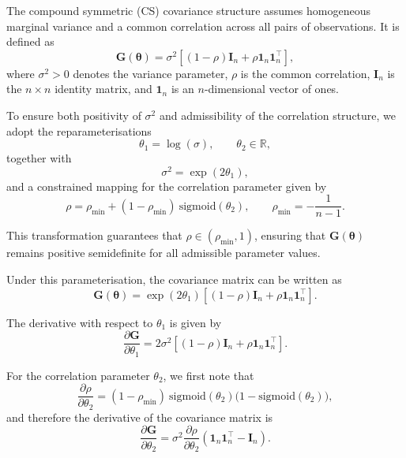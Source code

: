 \documentclass[
  letterpaper,
  DIV=11,
  numbers=noendperiod]{scrartcl}
\begin{document}
The compound symmetric (CS) covariance structure assumes homogeneous
marginal variance and a common correlation across all pairs of
observations. It is defined as \begin{equation}
\symbf{G}(\symbf{\theta}) = \sigma^2 \left[(1 - \rho)\symbf{I}_n + \rho \mathbf{1}_n \mathbf{1}_n^\top \right],
\end{equation} where \(\sigma^2 > 0\) denotes the variance parameter,
\(\rho\) is the common correlation, \(\symbf{I}_n\) is the
\(n \times n\) identity matrix, and \(\mathbf{1}_n\) is an
\(n\)-dimensional vector of ones.

To ensure both positivity of \(\sigma^2\) and admissibility of the
correlation structure, we adopt the reparameterisations \begin{equation}
\theta_1 = \log(\sigma), \qquad \theta_2 \in \mathbb{R},
\end{equation} together with \begin{equation}
\sigma^2 = \exp(2\theta_1),
\end{equation} and a constrained mapping for the correlation parameter
given by \begin{equation}
\rho = \rho_{\min} + (1 - \rho_{\min})~ \mathrm{sigmoid}(\theta_2),
\qquad \rho_{\min} = -\frac{1}{n - 1}.
\end{equation}

This transformation guarantees that \(\rho \in (\rho_{\min}, 1)\),
ensuring that \(\symbf{G}(\symbf{\theta})\) remains positive
semidefinite for all admissible parameter values.

Under this parameterisation, the covariance matrix can be written as
\begin{equation}
\symbf{G}(\symbf{\theta})
= \exp(2\theta_1)\left[(1 - \rho)\symbf{I}_n + \rho \mathbf{1}_n \mathbf{1}_n^\top \right].
\end{equation}

The derivative with respect to \(\theta_1\) is given by \begin{equation}
\frac{\partial \symbf{G}}{\partial \theta_1}
= 2\sigma^2 \left[(1 - \rho)\symbf{I}_n + \rho \mathbf{1}_n \mathbf{1}_n^\top \right].
\end{equation}

For the correlation parameter \(\theta_2\), we first note that
\begin{equation}
\frac{\partial \rho}{\partial \theta_2}
= (1 - \rho_{\min})~ \mathrm{sigmoid}(\theta_2)\big(1 - \mathrm{sigmoid}(\theta_2)\big),
\end{equation} and therefore the derivative of the covariance matrix is
\begin{equation}
\frac{\partial \symbf{G}}{\partial \theta_2}
= \sigma^2 \frac{\partial \rho}{\partial \theta_2}
\left(\mathbf{1}_n \mathbf{1}_n^\top - \symbf{I}_n \right).
\end{equation}
\end{document}
